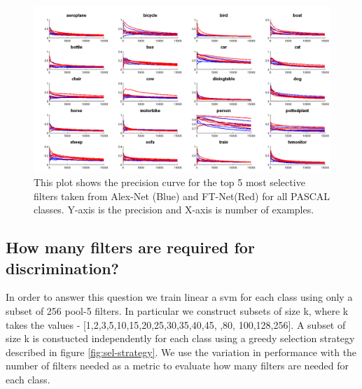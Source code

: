 \documentclass[runningheads]{llncs}
\begin{document}
\begin{figure}[t!]
\centering
\includegraphics[scale=0.20]{images/prob_sel_dims_top5.png}
\caption{This plot shows the precision curve for the top 5 most selective filters taken from Alex-Net (Blue) and FT-Net(Red) for all PASCAL classes. Y-axis is the precision and X-axis is number of examples.}
\label{fig:prob-sel}
\end{figure}

\subsection{How many filters are required for discrimination?}
\label{sub:how-many}
In order to answer this question we train linear a svm for each class using only a subset of 256 pool-5 filters. In particular we construct subsets of size k, where k takes the values - [1,2,3,5,10,15,20,25,30,35,40,45, ,80, 100,128,256]. A subset of size k is constucted independently for each class using a greedy selection strategy described in figure \ref{fig:sel-strategy}. We use the variation in performance with the number of filters needed as a metric to evaluate how many filters are needed for each class. 
  
\end{document}
